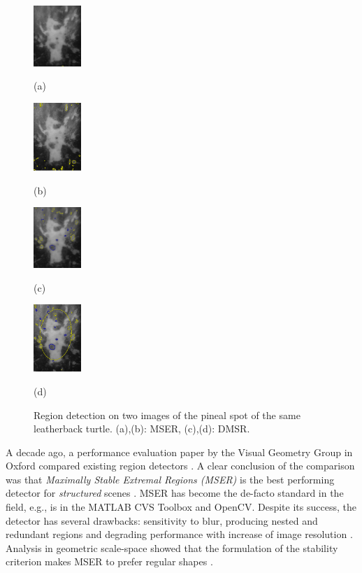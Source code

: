 \documentclass{article}
\begin{document}
\begin{figure}[htb]

\begin{minipage}[b]{.24\linewidth}
  \centering
  \centerline{\includegraphics[width=1.8cm]{./Figs/mserLeatherbackA}}
   \centerline{(a)}\medskip
\end{minipage}
\hfill
\begin{minipage}[b]{0.24\linewidth}
  \centering
  \centerline{\includegraphics[width=1.8cm]{./Figs/mserLeatherbackB}}
\centerline{(b)}\medskip
\end{minipage}
\hfill
\begin{minipage}[b]{.24\linewidth}
  \centering
  \centerline{\includegraphics[width=1.8cm]{./Figs/dmsrLeatherbackA}}
\centerline{(c)}\medskip
\end{minipage}
\hfill
\begin{minipage}[b]{0.24\linewidth}
  \centering
  \centerline{\includegraphics[width=1.8cm]{./Figs/dmsrLeatherbackB}}
 \centerline{(d)}\medskip
\end{minipage}
 \vspace{-0.4cm} 
\caption{Region detection on two images of the pineal spot of the same leatherback turtle.
(a),(b): MSER, (c),(d): DMSR.}
\label{fig:turtle}
 \vspace{-0.4cm}
\end{figure}

A decade ago, a performance evaluation paper by the Visual Geometry Group in Oxford compared existing region detectors \cite{Mikolajczyk:2005}. 
A clear conclusion of the comparison was that {\em  Maximally Stable Extremal Regions (MSER)} is the best performing detector for {\em structured} scenes \cite{Matas2002BMVC}. MSER has become the de-facto standard in the field, e.g., is in the MATLAB CVS Toolbox and OpenCV. Despite its success, the detector has several drawbacks: sensitivity to blur, producing nested and redundant regions and degrading performance with increase of image resolution \cite{CorRos2013}. Analysis in geometric scale-space showed that the formulation of the stability criterion makes MSER to prefer regular shapes \cite{Kimmel11}.
\end{document}
